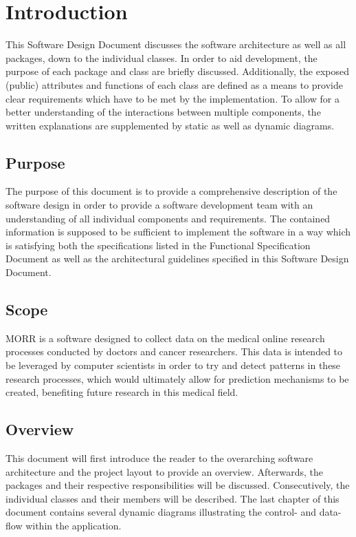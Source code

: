 \chapter{Introduction}
\label{ch:introduction}
This Software Design Document discusses the software architecture as well as all packages, down to the individual classes. In order to aid development, the purpose of each package and class are briefly discussed. Additionally, the exposed (public) attributes and functions of each class are defined as a means to provide clear requirements which have to be met by the implementation. To allow for a better understanding of the interactions between multiple components, the written explanations are supplemented by static as well as dynamic diagrams.

\section{Purpose}
The purpose of this document is to provide a comprehensive description of the software design in order to provide a software development team with an understanding of all individual components and requirements. The contained information is supposed to be sufficient to implement the software in a way which is satisfying both the specifications listed in the Functional Specification Document as well as the architectural guidelines specified in this Software Design Document.

\section{Scope}
MORR is a software designed to collect data on the medical online research processes conducted by doctors and cancer researchers. This data is intended to be leveraged by computer scientists in order to try and detect patterns in these research processes, which would ultimately allow for prediction mechanisms to be created, benefiting future research in this medical field.

\section{Overview}
This document will first introduce the reader to the overarching software architecture and the project layout to provide an overview. Afterwards, the packages and their respective responsibilities will be discussed. Consecutively, the individual classes and their members will be described. The last chapter of this document contains several dynamic diagrams illustrating the control- and data-flow within the application.